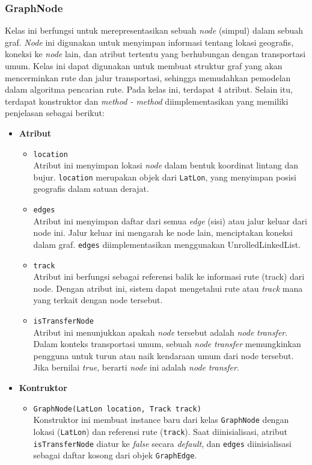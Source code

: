 \subsubsection{GraphNode}
\label{subss:graphnode}
Kelas ini berfungsi untuk merepresentasikan sebuah \textit{node} (simpul) dalam sebuah graf. \textit{Node} ini digunakan untuk menyimpan informasi tentang lokasi geografis, koneksi ke \textit{node} lain, dan atribut tertentu yang berhubungan dengan transportasi umum. Kelas ini dapat digunakan untuk membuat struktur graf yang akan mencerminkan rute dan jalur transportasi, sehingga memudahkan pemodelan dalam algoritma pencarian rute.
Pada kelas ini, terdapat 4 atribut. Selain itu, terdapat konstruktor dan \textit{method - method} diimplementasikan yang memiliki penjelasan sebagai berikut:
\begin{itemize}
    \item \textbf{Atribut}
    \begin{itemize}
        \item \texttt{location}
        \\ Atribut ini menyimpan lokasi \textit{node} dalam bentuk koordinat lintang dan bujur. \texttt{location} merupakan objek dari \texttt{LatLon}, yang menyimpan posisi geografis dalam satuan derajat.
        \item \texttt{edges}
        \\ Atribut ini menyimpan daftar dari semua \textit{edge} (sisi) atau jalur keluar dari node ini. Jalur keluar ini mengarah ke node lain, menciptakan koneksi dalam graf. \texttt{edges} diimplementasikan menggunakan UnrolledLinkedList.
        \item \texttt{track}
        \\ Atribut ini berfungsi sebagai referensi balik ke informasi rute (track) dari node. Dengan atribut ini, sistem dapat mengetahui rute atau \textit{track} mana yang terkait dengan node tersebut.
\newpage
        \item \texttt{isTransferNode}
        \\ Atribut ini menunjukkan apakah \textit{node} tersebut adalah \textit{node} \textit{transfer}. Dalam konteks transportasi umum, sebuah \textit{node} \textit{transfer} memungkinkan pengguna untuk turun atau naik kendaraan umum dari node tersebut. Jika bernilai \textit{true}, berarti \textit{node} ini adalah \textit{node} \textit{transfer}.
    \end{itemize}

    \item \textbf{Kontruktor}
    \begin{itemize}
        \item \texttt{GraphNode(LatLon location, Track track)}
        \\ Konstruktor ini membuat instance baru dari kelas \texttt{GraphNode} dengan lokasi (\texttt{LatLon}) dan referensi rute (\texttt{track}). Saat diinisialisasi, atribut \texttt{isTransferNode} diatur ke \textit{false} secara \textit{default}, dan \texttt{edges} diinisialisasi sebagai daftar kosong dari objek \texttt{GraphEdge}.
    \end{itemize}


\end{itemize}
